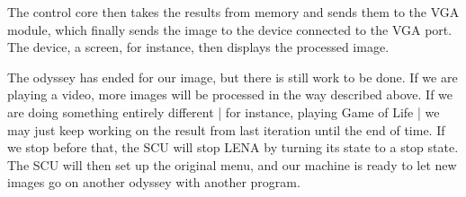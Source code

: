 The control core then takes the results from memory and sends them to the
\ac{VGA} module, which finally sends the image to the device connected to the
\ac{VGA} port. The device, a screen, for instance, then displays the processed
image.

The odyssey has ended for our image, but there is still work to be done. If we
are playing a video, more images will be processed in the way described
above. If we are doing something entirely different | for instance, playing Game
of Life | we may just keep working on the result from last iteration until the
end of time. If we stop before that, the \ac{SCU} will stop \ac{LENA} by turning
its state to a stop state. The \ac{SCU} will then set up the original menu, and
our machine is ready to let new images go on another odyssey with another
program.
